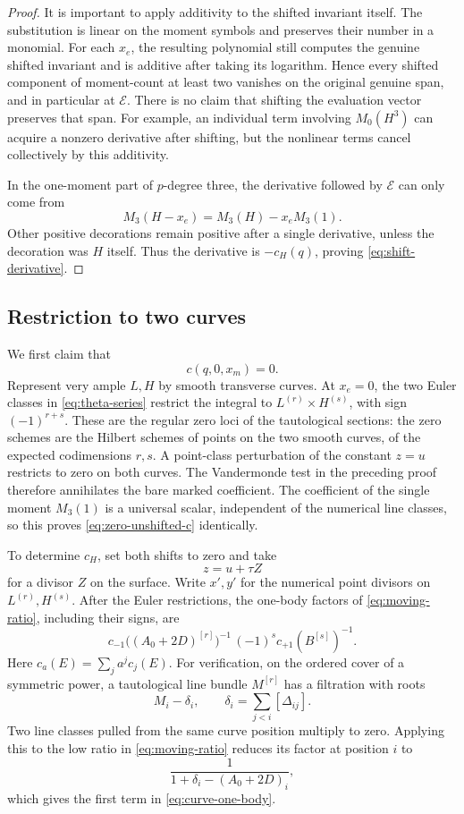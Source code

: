 \begin{proof}
It is important to apply additivity to the shifted invariant itself.
The substitution is linear on the moment symbols and preserves their
number in a monomial. For each \(x_e\), the resulting polynomial
still computes the genuine shifted invariant and is additive after
taking its logarithm. Hence every shifted component of moment-count
at least two vanishes on the original genuine span, and in
particular at \(\mathcal E\).
There is no claim that shifting the evaluation vector preserves
that span. For example, an individual term involving \(M_0(H^3)\)
can acquire a nonzero derivative after shifting, but the nonlinear
terms cancel collectively by this additivity.

In the one-moment part of \(p\)-degree three, the derivative followed
by \(\mathcal E\) can only come from
\[
 M_3(H-x_e)=M_3(H)-x_eM_3(1).
\]
Other positive decorations remain positive after a single derivative,
unless the decoration was \(H\) itself. Thus the derivative is
\(-c_H(q)\), proving \eqref{eq:shift-derivative}.
\end{proof}

\subsection{Restriction to two curves}

We first claim that
\begin{equation}\label{eq:zero-unshifted-c}
 c(q,0,x_m)=0.
\end{equation}
Represent very ample \(L,H\) by smooth transverse curves.
At \(x_e=0\), the two Euler classes in
\eqref{eq:theta-series} restrict the integral to
\(L^{(r)}\times H^{(s)}\), with sign \((-1)^{r+s}\).
These are the regular zero loci of the tautological sections:
the zero schemes are the Hilbert schemes of points on the two smooth
curves, of the expected codimensions \(r,s\).
A point-class perturbation of the constant \(z=u\) restricts to zero
on both curves. The Vandermonde test in the preceding proof therefore
annihilates the bare marked coefficient.
The coefficient of the single moment \(M_3(1)\) is a universal scalar,
independent of the numerical line classes, so this proves
\eqref{eq:zero-unshifted-c} identically.

To determine \(c_H\), set both shifts to zero and take
\[
 z=u+\tau Z
\]
for a divisor \(Z\) on the surface. Write \(x',y'\) for the numerical
point divisors on \(L^{(r)},H^{(s)}\).
After the Euler restrictions, the one-body factors of
\eqref{eq:moving-ratio}, including their signs, are
\begin{equation}\label{eq:curve-one-body}
 c_{-1}\bigl((A_0+2D)^{[r]}\bigr)^{-1}
 \,(-1)^s c_{+1}(B^{[s]})^{-1}.
\end{equation}
Here \(c_a(E)=\sum_j a^j c_j(E)\).
For verification, on the ordered cover of a symmetric power,
a tautological line bundle \(M^{[r]}\) has a filtration with roots
\[
 M_i-\delta_i,\qquad
 \delta_i=\sum_{j<i}[\Delta_{ij}].
\]
Two line classes pulled from the same curve position multiply to
zero. Applying this to the low ratio in
\eqref{eq:moving-ratio} reduces its factor at position \(i\) to
\[
 \frac{1}{1+\delta_i-(A_0+2D)_i},
\]
which gives the first term in \eqref{eq:curve-one-body}.

